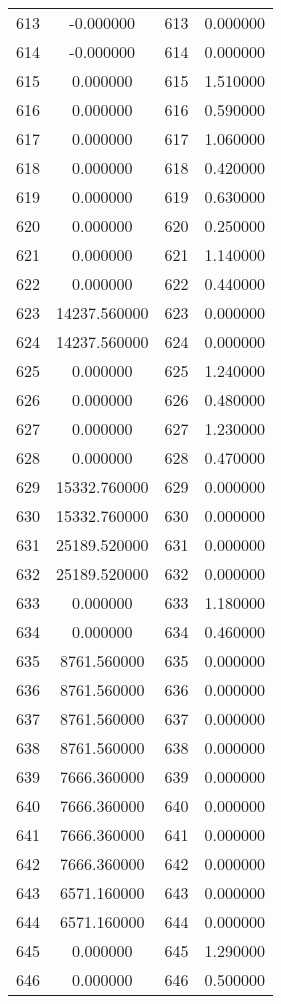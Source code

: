 \documentclass[12pt]{article}
\begin{document}
\begin{longtable}{@{}cccc@{}}
613 & -0.000000 & 613 & 0.000000 \\
614 & -0.000000 & 614 & 0.000000 \\
615 & 0.000000 & 615 & 1.510000 \\
616 & 0.000000 & 616 & 0.590000 \\
617 & 0.000000 & 617 & 1.060000 \\
618 & 0.000000 & 618 & 0.420000 \\
619 & 0.000000 & 619 & 0.630000 \\
620 & 0.000000 & 620 & 0.250000 \\
621 & 0.000000 & 621 & 1.140000 \\
622 & 0.000000 & 622 & 0.440000 \\
623 & 14237.560000 & 623 & 0.000000 \\
624 & 14237.560000 & 624 & 0.000000 \\
625 & 0.000000 & 625 & 1.240000 \\
626 & 0.000000 & 626 & 0.480000 \\
627 & 0.000000 & 627 & 1.230000 \\
628 & 0.000000 & 628 & 0.470000 \\
629 & 15332.760000 & 629 & 0.000000 \\
630 & 15332.760000 & 630 & 0.000000 \\
631 & 25189.520000 & 631 & 0.000000 \\
632 & 25189.520000 & 632 & 0.000000 \\
633 & 0.000000 & 633 & 1.180000 \\
634 & 0.000000 & 634 & 0.460000 \\
635 & 8761.560000 & 635 & 0.000000 \\
636 & 8761.560000 & 636 & 0.000000 \\
637 & 8761.560000 & 637 & 0.000000 \\
638 & 8761.560000 & 638 & 0.000000 \\
639 & 7666.360000 & 639 & 0.000000 \\
640 & 7666.360000 & 640 & 0.000000 \\
641 & 7666.360000 & 641 & 0.000000 \\
642 & 7666.360000 & 642 & 0.000000 \\
643 & 6571.160000 & 643 & 0.000000 \\
644 & 6571.160000 & 644 & 0.000000 \\
645 & 0.000000 & 645 & 1.290000 \\
646 & 0.000000 & 646 & 0.500000 \\

\end{longtable}
\end{document}
